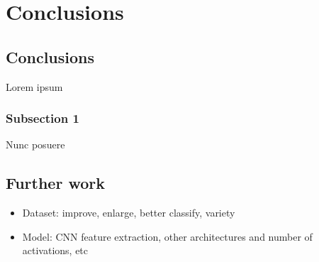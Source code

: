 
\chapter{Conclusions}

\label{Chapter6}


\section{Conclusions}

Lorem ipsum

\subsection{Subsection 1}

Nunc posuere

\section{Further work}

\begin{itemize}
	\item Dataset: improve, enlarge, better classify, variety
	\item Model: CNN feature extraction, other architectures and number of activations, etc
\end{itemize}